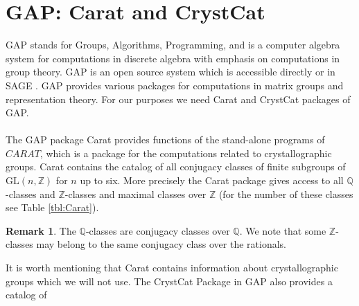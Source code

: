 \documentclass{article}
\theoremstyle{plain}
\theoremstyle{definition}
\newtheorem*{remark}{Remark}
\newcommand{\Z}{\ensuremath{\mathbb{Z}}}
\newcommand{\Q}{\ensuremath{\mathbb{Q}}}
\begin{document}
\section{GAP: Carat and CrystCat}
GAP \cite{GAP4} stands for Groups, Algorithms, Programming, and is a computer 
algebra system for computations in discrete algebra with emphasis on computations 
in group theory. GAP is an open source system which is accessible directly or 
in SAGE \cite{sagemath}. GAP provides various packages for computations in matrix 
groups and representation theory. For our purposes we need Carat and CrystCat packages of GAP.\\
\\
The GAP package Carat provides functions of the stand-alone programs of $CARAT$, 
which is a package for the computations related to crystallographic groups. Carat 
contains the catalog of all conjugacy classes of finite subgroups of $\mathrm{GL}(n,\Z)$ 
for $n$ up to six. More precisely the Carat package gives access to all 
$\Q$-classes and $\Z$-classes and maximal classes over $\Z$ (for the number of 
these classes see Table \ref{tbl:Carat}).  
\begin{remark}
The $\Q$-classes are conjugacy classes over $\Q$. We note that some $\Z$-classes 
may belong to the same conjugacy class over the rationals.
\end{remark}
It is worth mentioning that Carat contains information about crystallographic groups 
which we will not use. The CrystCat Package in GAP also provides a catalog of 
\end{document}
